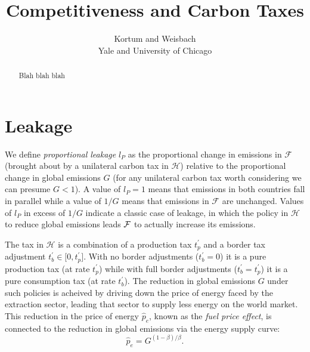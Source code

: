 \documentclass[notitlepage,12pt]{article}
\begin{document}
\title{Competitiveness and Carbon Taxes}
\author{Kortum and Weisbach \\
Yale and University of Chicago}
\maketitle

\begin{abstract}
Blah blah blah
\end{abstract}

\section{Leakage}

We define \emph{proportional leakage} $l_{P}$ as the proportional change in
emissions in $\mathcal{F}$ (brought about by a unilateral carbon tax in $%
\mathcal{H}$) relative to the proportional change in global emissions $G$
(for any unilateral carbon tax worth considering we can presume $G<1$). A
value of $l_{P}=1$ means that emissions in both countries fall in parallel
while a value of $1/G$ means that emissions in $\mathcal{F}$ are unchanged.
Values of $l_{P}$ in excess of $1/G$ indicate a classic case of leakage, in
which the policy in $\mathcal{H}$ to reduce global emissions leads $\mathcal{%
F}$ to actually increase its emissions.

The tax in $\mathcal{H}$ is a combination of a production tax $t_{p}^{\prime
}$ and a border tax adjustment $t_{b}^{\prime }\in \lbrack 0,t_{p}^{\prime
}] $. With no border adjustments ($t_{b}^{\prime }=0$) it is a pure
production tax (at rate $t_{p}^{\prime }$) while with full border
adjustments ($t_{b}^{\prime }=t_{p}^{\prime }$) it is a pure consumption tax
(at rate $t_{b}^{\prime }$). The reduction in global emissions $G$ under
such policies is acheived by driving down the price of energy faced by the
extraction sector, leading that sector to supply less energy on the world
market. This reduction in the price of energy $\hat{p}_{e}$, known as the 
\emph{fuel price effect}, is connected to the reduction in global emissions
via the energy supply curve:%
\begin{equation*}
\hat{p}_{e}=G^{(1-\beta )/\beta }.
\end{equation*}
\end{document}
